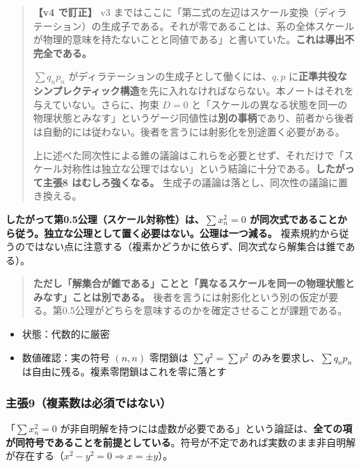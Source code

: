 \documentclass[
  10pt,
]{ltjsarticle}
\providecommand{\tightlist}{%
  \setlength{\itemsep}{0pt}\setlength{\parskip}{0pt}}
\begin{document}
\begin{quote}
\textbf{【v4 で訂正】} v3
まではここに「第二式の左辺はスケール変換（ディラテーション）の生成子である。それが零であることは、系の全体スケールが物理的意味を持たないことと同値である」と書いていた。\textbf{これは導出不完全である。}

\(\sum q_np_n\) がディラテーションの生成子として働くには、\(q, p\)
に\textbf{正準共役なシンプレクティック構造}を先に入れなければならない。本ノートはそれを与えていない。さらに、拘束
\(D = 0\)
と「スケールの異なる状態を同一の物理状態とみなす」というゲージ同値性は\textbf{別の事柄}であり、前者から後者は自動的には従わない。後者を言うには射影化を別途置く必要がある。

上に述べた同次性による錐の議論はこれらを必要とせず、それだけで「スケール対称性は独立な公理ではない」という結論に十分である。\textbf{したがって主張8
はむしろ強くなる。} 生成子の議論は落とし、同次性の議論に置き換える。
\end{quote}

\textbf{したがって第0.5公理（スケール対称性）は、\(\sum x_n^2 = 0\)
が同次式であることから従う。独立な公理として置く必要はない。公理は一つ減る。}
複素規約から従うのではない点に注意する（複素かどうかに依らず、同次式なら解集合は錐である）。

\begin{quote}
\textbf{ただし「解集合が錐である」ことと「異なるスケールを同一の物理状態とみなす」ことは別である。}
後者を言うには射影化という別の仮定が要る。第0.5公理がどちらを意味するのかを確定させることが課題である。
\end{quote}

\begin{itemize}
\tightlist
\item
  状態：代数的に厳密
\item
  数値確認：実の符号 \((n,n)\) 零閉鎖は \(\sum q^2 = \sum p^2\)
  のみを要求し、\(\sum q_np_n\)
  は自由に残る。複素零閉鎖はこれを零に落とす
\end{itemize}

\subsubsection{主張9（複素数は必須ではない）}\label{ux4e3bux5f359ux8907ux7d20ux6570ux306fux5fc5ux9808ux3067ux306fux306aux3044}

「\(\sum x_n^2 = 0\)
が非自明解を持つには虚数が必要である」という論証は、\textbf{全ての項が同符号であることを前提としている}。符号が不定であれば実数のまま非自明解が存在する（\(x^2 - y^2 = 0 \Rightarrow x = \pm y\)）。
\end{document}
